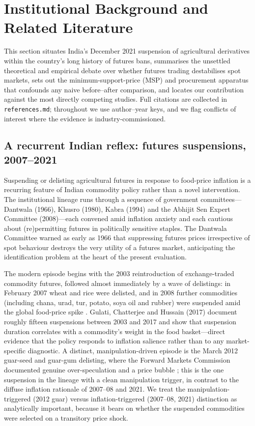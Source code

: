 \section{Institutional Background and Related Literature}
\label{sec:background}

This section situates India's December 2021 suspension of agricultural derivatives
within the country's long history of futures bans, summarises the unsettled
theoretical and empirical debate over whether futures trading destabilises spot
markets, sets out the minimum-support-price (MSP) and procurement apparatus that
confounds any naive before--after comparison, and locates our contribution against
the most directly competing studies. Full citations are collected in
\texttt{references.md}; throughout we use author--year keys, and we flag conflicts
of interest where the evidence is industry-commissioned.

\subsection{A recurrent Indian reflex: futures suspensions, 2007--2021}
\label{sec:background-history}

Suspending or delisting agricultural futures in response to food-price inflation is
a recurring feature of Indian commodity policy rather than a novel intervention. The
institutional lineage runs through a sequence of government committees---Dantwala
(1966), Khusro (1980), Kabra (1994) and the Abhijit Sen Expert Committee
(2008)---each convened amid inflation anxiety and each cautious about (re)permitting
futures in politically sensitive staples. The Dantwala Committee warned as early as
1966 that suppressing futures prices irrespective of spot behaviour destroys the very
utility of a futures market, anticipating the identification problem at the heart of
the present evaluation.

The modern episode begins with the 2003 reintroduction of exchange-traded
commodity futures, followed almost immediately by a wave of delistings: in February
2007 wheat and rice were delisted, and in 2008 further commodities (including chana,
urad, tur, potato, soya oil and rubber) were suspended amid the global food-price
spike \citep{Nath2008, Babshetti2019}. Gulati, Chatterjee and Hussain (2017)
document roughly fifteen suspensions between 2003 and 2017 and show that suspension
duration correlates with a commodity's weight in the food basket---direct evidence
that the policy responds to inflation salience rather than to any market-specific
diagnostic. A distinct, manipulation-driven episode is the March 2012 guar-seed and
guar-gum delisting, where the Forward Markets Commission documented genuine
over-speculation and a price bubble \citep{Singh2012, Soni2013}; this is the one
suspension in the lineage with a clean manipulation trigger, in contrast to the
diffuse inflation rationale of 2007--08 and 2021. We treat the manipulation-triggered
(2012 guar) versus inflation-triggered (2007--08, 2021) distinction as analytically
important, because it bears on whether the suspended commodities were selected on a
transitory price shock.

